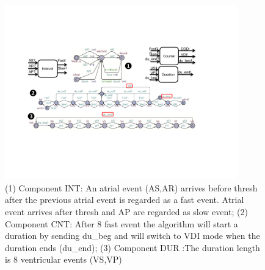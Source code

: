 \begin{figure}
		\centering
		\includegraphics[width=0.9\textwidth]{figs/duration.pdf}
		\vspace{-10pt}
		\caption{\small (1) Component \textsf{INT}: An atrial event (\textsf{AS,AR}) arrives before \textsf{thresh} after the previous atrial event is regarded as a \textsf{fast} event. Atrial event arrives after \textsf{thresh} and \textsf{AP} are regarded as \textsf{slow} event; (2) Component \textsf{CNT}: After 8 \textsf{fast} event the algorithm will start a duration by sending \textsf{du\_beg} and will switch to \textsf{VDI} mode when the duration ends (\textsf{du\_end}); (3) Component \textsf{DUR} :The duration length is 8 ventricular events (\textsf{VS,VP})}
		\label{fig:dur_count}
\end{figure} 

